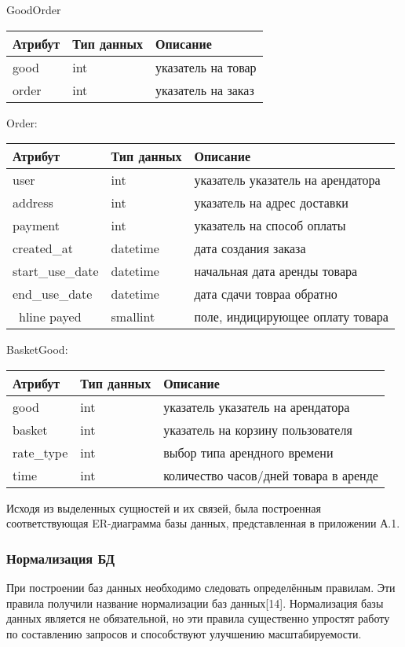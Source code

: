 GoodOrder

\begin{tabular}{ | l | l | l | }
    \hline
    Атрибут & Тип данных & Описание  \\ \hline
    good & int & указатель на товар \\ \hline
    order & int & указатель на заказ \\ \hline
\hline
\end{tabular}

Order:

\begin{tabular}{ | l | l | l | }
    \hline
    Атрибут & Тип данных & Описание  \\ \hline
    user & int & указатель указатель на арендатора \\ \hline
    address & int & указатель на адрес доставки \\ \hline
    payment & int & указатель на способ оплаты \\ \hline
    created\_at & datetime & дата создания заказа  \\ \hline
    start\_use\_date & datetime & начальная дата аренды товара \\ \hline
    end\_use\_date & datetime & дата сдачи товраа обратно \\ \ hline
    payed & smallint & поле, индицирующее оплату товара \\
\hline
\end{tabular}

BasketGood:

\begin{tabular}{ | l | l | l | }
    \hline
    Атрибут & Тип данных & Описание  \\ \hline
    good & int & указатель указатель на арендатора \\ \hline
    basket & int & указатель на корзину пользователя  \\ \hline
    rate\_type & int & выбор типа арендного времени \\ \hline
    time & int & количество часов/дней товара в аренде \\
\hline
\end{tabular}

Исходя из выделенных сущностей и их связей, была построенная соответствующая ER-диаграмма базы данных, представленная в приложении А.1.

\subsubsection{Нормализация БД}
При построении баз данных необходимо следовать определённым правилам.
Эти правила получили название нормализации баз данных[14].
Нормализация базы данных является не обязательной, но эти правила существенно упростят работу по составлению запросов и способствуют улучшению масштабируемости.

